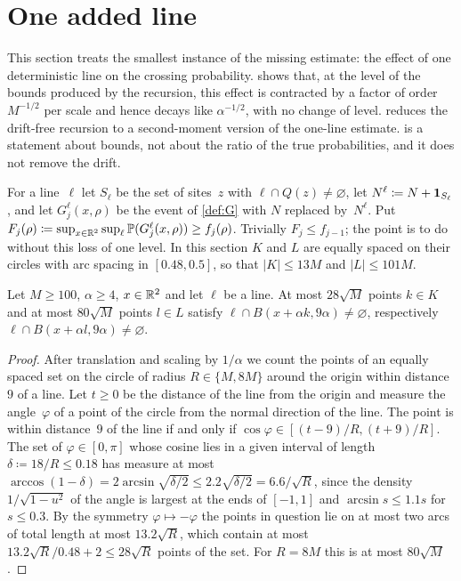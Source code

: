 \documentclass[11pt,letterpaper]{article}
\begin{document}
\section{One added line}
\label{sec:oneline}

This section treats the smallest instance of the missing estimate: the effect of one deterministic line on the crossing probability.  shows that, at the level of the bounds produced by the recursion, this effect is contracted by a factor of order $M^{-1/2}$ per scale and hence decays like $\alpha^{-1/2}$, with no change of level.  reduces the drift-free recursion to a second-moment version of the one-line estimate.  is a statement about bounds, not about the ratio of the true probabilities, and it does not remove the drift.

For a line~$\ell$ let $S_\ell$ be the set of sites~$z$ with $\ell\cap Q(z)\neq\varnothing$, let $N^\ell\coloneqq N+\mathbf{1}_{S_\ell}$, and let $G^\ell_j(x,\rho)$ be the event of \cref{def:G} with $N$ replaced by~$N^\ell$. Put $F_j(\rho)\coloneqq\sup_{x\in\mathbb R^2}\sup_\ell\mathbb P(G^\ell_j(x,\rho))\ge f_j(\rho)$. Trivially $F_j\le f_{j-1}$; the point is to do without this loss of one level. In this section $K$ and $L$ are equally spaced on their circles with arc spacing in $[0.48,0.5]$, so that $\lvert K\rvert\le13M$ and $\lvert L\rvert\le101M$.

\begin{lemma}
\label{lem:chord}
Let $M\ge100$, $\alpha\ge4$, $x\in\mathbb R^2$ and let $\ell$ be a line. At most $28\sqrt M$ points $k\in K$ and at most $80\sqrt M$ points $l\in L$ satisfy $\ell\cap B(x+\alpha k,9\alpha)\neq\varnothing$, respectively $\ell\cap B(x+\alpha l,9\alpha)\neq\varnothing$.
\end{lemma}

\begin{proof}
After translation and scaling by $1/\alpha$ we count the points of an equally spaced set on the circle of radius $R\in\{M,8M\}$ around the origin within distance~$9$ of a line. Let $t\ge0$ be the distance of the line from the origin and measure the angle~$\varphi$ of a point of the circle from the normal direction of the line. The point is within distance~$9$ of the line if and only if $\cos\varphi\in[(t-9)/R,(t+9)/R]$. The set of $\varphi\in[0,\pi]$ whose cosine lies in a given interval of length $\delta\coloneqq18/R\le0.18$ has measure at most $\arccos(1-\delta)=2\arcsin\sqrt{\delta/2}\le2.2\sqrt{\delta/2}=6.6/\sqrt R$, since the density $1/\sqrt{1-u^2}$ of the angle is largest at the ends of $[-1,1]$ and $\arcsin s\le1.1s$ for $s\le0.3$. By the symmetry $\varphi\mapsto-\varphi$ the points in question lie on at most two arcs of total length at most $13.2\sqrt R$, which contain at most $13.2\sqrt R/0.48+2\le28\sqrt R$ points of the set. For $R=8M$ this is at most $80\sqrt M$.
\end{proof}
\end{document}
